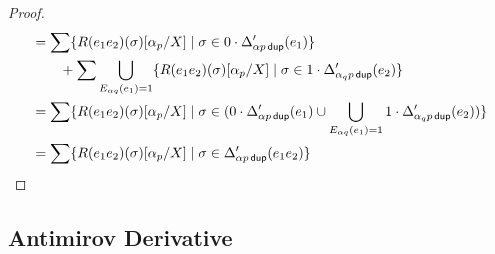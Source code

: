 \documentclass{article}
\newcommand\pdup{\mathop{\mathsf{dup}}}
\renewcommand\star{^{\textstyle *}}
\begin{document}
\begin{proof}
\begin{align*}
&= \sum\set{\rep{\sigma}{e_1e_2}\subst{\alpha_p}X}{\sigma\in 0\cdot\Delta'_{\alpha p\pdup}(e_1)}\\
& \qquad + \sum\bigcup_{E_{\alpha q}(e_1)=1}\set{\rep{\sigma}{e_1e_2}\subst{\alpha_p}X}{\sigma\in 1\cdot\Delta'_{\alpha_qp\pdup}(e_2)}\\
&= \sum\set{\rep{\sigma}{e_1e_2}\subst{\alpha_p}X}{\sigma\in (0\cdot\Delta'_{\alpha p\pdup}(e_1) \cup \bigcup_{E_{\alpha q}(e_1)=1} 1\cdot\Delta'_{\alpha_qp\pdup}(e_2))}\\
&= \sum\set{\rep{\sigma}{e_1e_2}\subst{\alpha_p}X}{\sigma\in\Delta'_{\alpha p\pdup}(e_1e_2)}
\end{align*}
\end{proof}

\subsection*{Antimirov Derivative}
\end{document}
